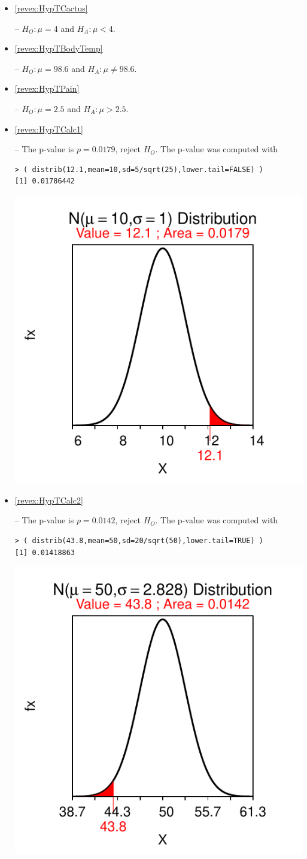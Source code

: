 \documentclass[10pt,openany]{book}\usepackage[]{graphicx}\usepackage[]{color}
\makeatletter
\newenvironment{kframe}{%
 \def\at@end@of@kframe{}%
 \ifinner\ifhmode%
  \def\at@end@of@kframe{\end{minipage}}%
  \begin{minipage}{\columnwidth}%
 \fi\fi%
 \def\FrameCommand##1{\hskip\@totalleftmargin \hskip-\fboxsep
 \colorbox{shadecolor}{##1}\hskip-\fboxsep
     \hskip-\linewidth \hskip-\@totalleftmargin \hskip\columnwidth}%
 \MakeFramed {\advance\hsize-\width
   \@totalleftmargin\z@ \linewidth\hsize
   \@setminipage}}%
 {\par\unskip\endMakeFramed%
 \at@end@of@kframe}
\newenvironment{knitrout}{}{} %
\makeatother
\begin{document}
\begin{itemize}
  \item \hypertarget{ans:HypTCactus}{\ref{revex:HypTCactus}} -- $H_{O}:\mu=4$ and $H_{A}:\mu<4$.
  \item \hypertarget{ans:HypTBodyTemp}{\ref{revex:HypTBodyTemp}} -- $H_{O}:\mu=98.6$ and $H_{A}:\mu\neq98.6$.
  \item \hypertarget{ans:HypTPain}{\ref{revex:HypTPain}} -- $H_{O}:\mu=2.5$ and $H_{A}:\mu>2.5$.

  \item \hypertarget{ans:HypTCalc1}{\ref{revex:HypTCalc1}} -- The p-value is $p=0.0179$, reject $H_{O}$.  The p-value was computed with
\begin{knitrout}
\color{fgcolor}\begin{kframe}
\begin{verbatim}
> ( distrib(12.1,mean=10,sd=5/sqrt(25),lower.tail=FALSE) )
[1] 0.01786442
\end{verbatim}
\end{kframe}

{\centering \includegraphics[width=.4\linewidth]{Figs/HypTCalc1-1} 

}



\end{knitrout}
  \item \hypertarget{ans:HypTCalc2}{\ref{revex:HypTCalc2}} -- The p-value is $p=0.0142$, reject $H_{O}$.  The p-value was computed with
\begin{knitrout}
\color{fgcolor}\begin{kframe}
\begin{verbatim}
> ( distrib(43.8,mean=50,sd=20/sqrt(50),lower.tail=TRUE) )
[1] 0.01418863
\end{verbatim}
\end{kframe}

{\centering \includegraphics[width=.4\linewidth]{Figs/HypTCalc2-1} 

}
\end{knitrout}
\end{itemize}
\end{document}
